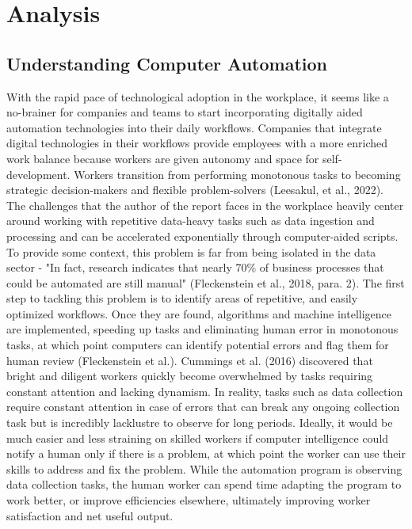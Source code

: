 \documentclass[12pt]{article}
\begin{document}
\newpage
\section{Analysis} 



\subsection{Understanding Computer Automation}
\indent\hspace{0.5in} With the rapid pace of technological adoption in the workplace, it seems like a no-brainer for companies and teams to start incorporating digitally aided automation technologies into their daily workflows. Companies that integrate digital technologies in their workflows provide employees with a more enriched work balance because workers are given autonomy and space for self-development. Workers transition from performing monotonous tasks to becoming strategic decision-makers and flexible problem-solvers (Leesakul, et al., 2022). The challenges that the author of the report faces in the workplace heavily center around working with repetitive data-heavy tasks such as data ingestion and processing and can be accelerated exponentially through computer-aided scripts. To provide some context, this problem is far from being isolated in the data sector - "In fact, research indicates that nearly 70\% of business processes that could be automated are still manual" (Fleckenstein et al., 2018, para. 2). The first step to tackling this problem is to identify areas of repetitive, and easily optimized workflows. Once they are found, algorithms and machine intelligence are implemented, speeding up tasks and eliminating human error in monotonous tasks, at which point computers can identify potential errors and flag them for human review (Fleckenstein et al.). Cummings et al. (2016) discovered that bright and diligent workers quickly become overwhelmed by tasks requiring constant attention and lacking dynamism. In reality, tasks such as data collection require constant attention in case of errors that can break any ongoing collection task but is incredibly lacklustre to observe for long periods. Ideally, it would be much easier and less straining on skilled workers if computer intelligence could notify a human only if there is a problem, at which point the worker can use their skills to address and fix the problem. While the automation program is observing data collection tasks, the human worker can spend time adapting the program to work better, or improve efficiencies elsewhere, ultimately improving worker satisfaction and net useful output. 
\end{document}
